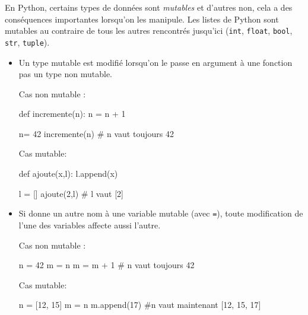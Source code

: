 \documentclass[11pt,a4paper]{article}
\begin{document}
\begin{tcolorbox}[left=0cm,title=\bf{\faPython \; Mutables et non mutables},colbacktitle=cfond]
    En Python, certains types de données sont \textit{mutables} et d'autres non, cela a des conséquences importantes lorsqu'on les manipule. Les listes de Python sont mutables au contraire de tous les autres rencontrés jusqu'ici ({\tt int}, {\tt float}, {\tt bool}, {\tt str}, {\tt tuple}).
    \begin{itemize}
        \item[\textbullet] Un type mutable est modifié lorsqu'on le passe en argument à une fonction pas un type non mutable.
        \setlength{\multicolsep}{0pt}
        \begin{multicols}{2}
            Cas non mutable :
            \begin{python}
def incremente(n):
    n = n + 1

n= 42
incremente(n)
# n vaut toujours 42
\end{python}
            Cas mutable: 
            \begin{python} 
def ajoute(x,l):
    l.append(x)

l = []
ajoute(2,l)
# l vaut [2]
            \end{python}
        \end{multicols}
    \item[\textbullet] Si donne un autre nom à une variable mutable (avec {\tt =}), toute modification de l'une des variables affecte aussi l'autre.
    \setlength{\multicolsep}{0pt}
    \begin{multicols}{2}
        Cas non mutable :
        \begin{python}
n = 42
m = n
m = m + 1
# n vaut toujours 42
\end{python}
        Cas mutable: 
        \begin{python} 
n = [12, 15]
m = n
m.append(17)
#n vaut maintenant [12, 15, 17]
        \end{python}
    \end{multicols}
    \end{itemize}
\end{tcolorbox}
\end{document}
